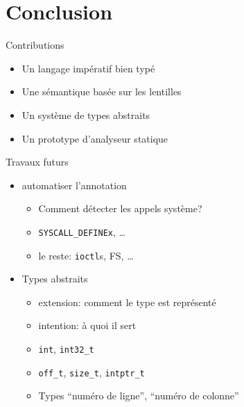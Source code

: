 \section{Conclusion}

\begin{frame}{Contributions}
\begin{itemize}
\item Un langage impératif bien typé
\item Une sémantique basée sur les lentilles
\item Un système de types abstraits
\item Un prototype d'analyseur statique
\end{itemize}
\end{frame}

\begin{frame}{Travaux futurs}
    \begin{itemize}
        \item automatiser l'annotation
            \begin{itemize}
                \item Comment détecter les appels système?
                \item \texttt{SYSCALL\_DEFINEx}, …
                \item le reste: \texttt{ioctl}s, FS, …
            \end{itemize}
        \item Types abstraits
            \begin{itemize}
                \item extension: comment le type est représenté
                \item intention: à quoi il sert
                \item \texttt{int}, \texttt{int32\_t}
                \item \texttt{off\_t}, \texttt{size\_t}, \texttt{intptr\_t}
                \item Types \enquote{numéro de ligne}, \enquote{numéro de colonne}
            \end{itemize}
        \end{itemize}
\end{frame}
